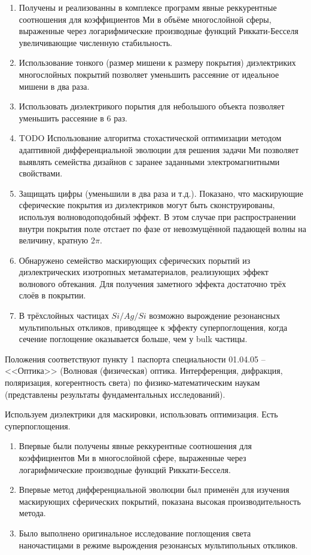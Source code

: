 \begin{enumerate}
  \item Получены и реализованны в комплексе программ явные
    реккурентные соотношения для коэффициентов Ми в объёме
    многослойной сферы, выраженные через логарифмические производные
    функций Риккати-Бесселя увеличивающие численную стабильность.  
  
  \item Использование тонкого (размер мишени к размеру покрытия) диэлектриких многослойных покрытий позволяет
    уменьшить рассеяние от идеальное мишени в два раза.
  \item Использовать диэлектрикого порытия для небольшого объекта
    позволяет уменьшить рассеяние в 6 раз.

  \item TODO Использование алгоритма стохастической оптимизации методом
    адаптивной дифференциальной эволюции для решения задачи Ми
    позволяет выявлять семейства дизайнов с заранее заданными
    электромагнитными свойствами.

  \item Защищать цифры (уменьшили в два раза и т.д.). Показано, что
    маскирующие сферические покрытия из диэлектриков могут быть
    сконструированы, используя волноводоподобный эффект.  В этом
    случае при распространении внутри покрытия поле отстает по фазе от
    невозмущённой падающей волны на величину, кратную $2\pi$.
  \item Обнаружено семейство маскирующих сферических порытий из
    диэлектрических изотропных метаматериалов, реализующих эффект
    волнового обтекания.  Для получения заметного эффекта достаточно
    трёх слоёв в покрытии.
  \item В трёхслойных частицах $Si/Ag/Si$ возможно вырождение
    резонансных мультипольных откликов, приводящее к эффекту
    суперпоглощения, когда сечение поглощение оказывается больше, чем
    у bulk частицы. 
  \end{enumerate}

Положения соответствуют пункту 1 паспорта специальности 01.04.05 --
<<Оптика>> (Волновая (физическая) оптика. Интерференция, дифракция,
поляризация, когерентность света) по физико-математическим
наукам (представлены результаты фундаментальных исследований).

\novelty Используем диэлектрики для маскировки, использовать
оптимизация. Есть суперпоглощения.
\begin{enumerate}
  \item Впервые были получены явные реккурентные соотношения для
    коэффициентов Ми в многослойной сфере, выраженные через
    логарифмические производные функций Риккати-Бесселя. 
  \item Впервые метод дифференциальной эволюции был применён
    для изучения маскирующих сферических покрытий, показана высокая
    производительность метода.
  \item Было выполнено оригинальное исследование поглощения света
    наночастицами в режиме вырождения резонансых мультипольных откликов.
\end{enumerate}

